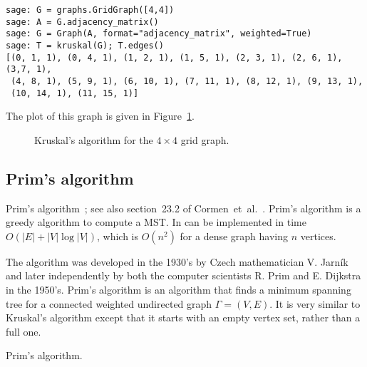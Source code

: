 \begin{lstlisting}
sage: G = graphs.GridGraph([4,4])
sage: A = G.adjacency_matrix()
sage: G = Graph(A, format="adjacency_matrix", weighted=True)
sage: T = kruskal(G); T.edges()
[(0, 1, 1), (0, 4, 1), (1, 2, 1), (1, 5, 1), (2, 3, 1), (2, 6, 1), (3,7, 1),
 (4, 8, 1), (5, 9, 1), (6, 10, 1), (7, 11, 1), (8, 12, 1), (9, 13, 1),
 (10, 14, 1), (11, 15, 1)]
\end{lstlisting}
%
The plot of this graph is given in
Figure~\ref{fig:trees-forests:Kruskal_example}.

\begin{figure}[!htbp]
\centering

\caption{Kruskal's algorithm for the $4\times 4$ grid graph.}
\label{fig:trees-forests:Kruskal_example}
\end{figure}



\subsection{Prim's algorithm}
\label{subsec:trees_forests:Prim_algorithm}

Prim's algorithm~\cite{Prim1957}; see also section~23.2 of
Cormen~et~al.~\cite{CormenEtAl2001}. Prim's algorithm is a greedy
algorithm to compute a MST. In can be implemented in time
$O(|E| + |V| \log |V|)$, which is $O(n^2)$ for a dense graph having
$n$ vertices.

The algorithm was developed in the 1930's by Czech mathematician V.
Jarn\'ik and later independently by both the computer scientists R. Prim
and E. Dijkstra in the 1950's.
Prim's algorithm is an algorithm that finds a minimum spanning tree
for a connected weighted
undirected graph $\Gamma=(V,E)$. It is very similar to Kruskal's
algorithm except that it starts with an empty vertex set, rather than
a full one.

\begin{algorithm}[!htpb]

\caption{Prim's algorithm.}
\label{alg:tree-forest:prim}
\end{algorithm}

